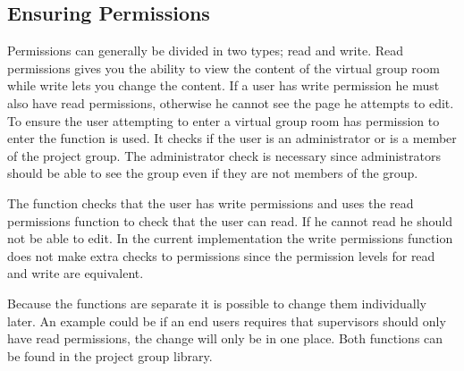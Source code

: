 \subsection{Ensuring Permissions}
\label{sec:projectgrouproommanagerights}
Permissions can generally be divided in two types; read and write. 
Read permissions gives you the ability to view the content of the virtual group room while write lets you change the content. 
If a user has write permission he must also have read permissions, otherwise he cannot see the page he attempts to edit. 
To ensure the user attempting to enter a virtual group room has permission to enter the function  is used. 
It checks if the user is an administrator or is a member of the project group. 
The administrator check is necessary since administrators should be able to see the group even if they are not members of the group. 

The function  checks that the user has write permissions and uses the read permissions function to check that the user can read.
If he cannot read he should not be able to edit. 
In the current implementation the write permissions function does not make extra checks to permissions since the permission levels for read and write are equivalent.

Because the functions are separate it is possible to change them individually later.
An example could be if an end users requires that supervisors should only have read permissions, the change will only be in one place. 
Both functions can be found in the project group library.
